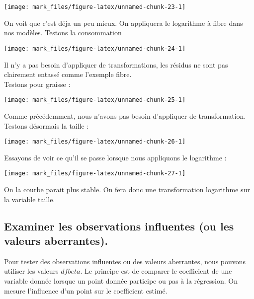 \documentclass[
]{article}
\begin{document}
\begin{center}\texttt{[image: mark\_files/figure-latex/unnamed-chunk-23-1]} \end{center}

On voit que c'est déja un peu mieux. On appliquera le logarithme à fibre
dans nos modèles. Testons la consommation

\begin{center}\texttt{[image: mark\_files/figure-latex/unnamed-chunk-24-1]} \end{center}

Il n'y a pas besoin d'appliquer de transformations, les résidus ne sont
pas clairement entassé comme l'exemple fibre.\\
Testons pour graisse :

\begin{center}\texttt{[image: mark\_files/figure-latex/unnamed-chunk-25-1]} \end{center}

Comme précédemment, nous n'avons pas besoin d'appliquer de
transformation.\\
Testons désormais la taille :

\begin{center}\texttt{[image: mark\_files/figure-latex/unnamed-chunk-26-1]} \end{center}

Essayons de voir ce qu'il se passe lorsque nous appliquons le logarithme
:

\begin{center}\texttt{[image: mark\_files/figure-latex/unnamed-chunk-27-1]} \end{center}

On la courbe parait plus stable. On fera donc une transformation
logarithme sur la variable taille.

\hypertarget{examiner-les-observations-influentes-ou-les-valeurs-aberrantes.}{%
\subsection{Examiner les observations influentes (ou les valeurs
aberrantes).}\label{examiner-les-observations-influentes-ou-les-valeurs-aberrantes.}}

Pour tester des observations influentes ou des valeurs aberrantes, nous
pouvons utiliser les valeurs \(dfbeta\). Le principe est de comparer le
coefficient de une variable donnée lorsque un point donnée participe ou
pas à la régression. On mesure l'influence d'un point sur le coefficient
estimé.
\end{document}
